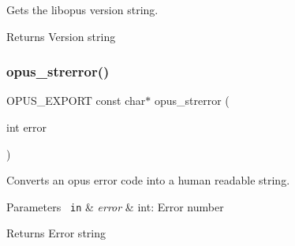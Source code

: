 Gets the libopus version string.

\begin{DoxyReturn}{Returns}
Version string 
\end{DoxyReturn}
\mbox{\label{group__opus__libinfo_ga4474c7a5797d39d8a3c3c14f64e9a30f}} 
\subsubsection{\texorpdfstring{opus\_strerror()}{opus\_strerror()}}
{\footnotesize\ttfamily O\+P\+U\+S\+\_\+\+E\+X\+P\+O\+RT const char$\ast$ opus\+\_\+strerror (\begin{DoxyParamCaption}\item[{int}]{error }\end{DoxyParamCaption})}

Converts an opus error code into a human readable string.


\begin{DoxyParams}[1]{Parameters}
\mbox{\texttt{ in}}  & {\em error} & {\ttfamily int}\+: Error number \\
\hline
\end{DoxyParams}
\begin{DoxyReturn}{Returns}
Error string 
\end{DoxyReturn}
